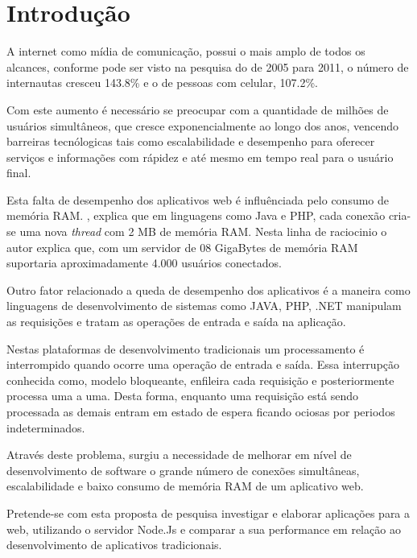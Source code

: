 \chapter{Introdução}
\label{introducao}

\vspace{-1.9cm}

  
  A internet como mídia de comunicação, possui o mais amplo de todos os alcances, 
  conforme pode ser visto na pesquisa do  de 2005 para 2011, 
  o número de internautas cresceu 143.8\%  e o de pessoas com celular, 107.2\%.
  
  Com este aumento é necessário se preocupar com a quantidade de milhões de usuários simultâneos,
  que cresce exponencialmente ao longo dos anos, vencendo barreiras tecnólogicas tais como 
  escalabilidade e desempenho para oferecer serviços e informações com rápidez e até mesmo em tempo
  real para o usuário final.
  
  Esta falta de desempenho dos aplicativos web é influênciada pelo consumo de memória RAM. , explica que 
  em linguagens como Java e PHP, cada conexão cria-se uma nova \textit{thread} com 2 MB de memória RAM. Nesta linha 
  de raciocinio o autor explica que, com um servidor de 08 GigaBytes de memória RAM suportaria aproximadamente 4.000 usuários
  conectados.
  
  Outro fator relacionado a queda de desempenho dos aplicativos é a maneira como linguagens de desenvolvimento de sistemas como JAVA, PHP,
  .NET manipulam as requisições e tratam as operações de entrada e saída na aplicação. 
  
  Nestas plataformas de desenvolvimento tradicionais um processamento é interrompido quando ocorre uma operação de entrada e saída.
  Essa interrupção conhecida como, modelo bloqueante, enfileira cada requisição e posteriormente processa uma a uma. Desta forma, 
  enquanto uma requisição está sendo processada as demais entram em estado de espera ficando ociosas
  por periodos indeterminados.\cite{Pereira:2013}
  
  Através deste problema, surgiu a necessidade de melhorar em nível de desenvolvimento de software o grande número de conexões 
  simultâneas, escalabilidade e baixo consumo de memória RAM de um aplicativo web.\cite{Oliveira:2012}
  
  Pretende-se com esta proposta de pesquisa investigar e elaborar aplicações para a web, 
  utilizando o servidor Node.Js e comparar a sua performance em relação ao desenvolvimento
  de aplicativos tradicionais.
  
